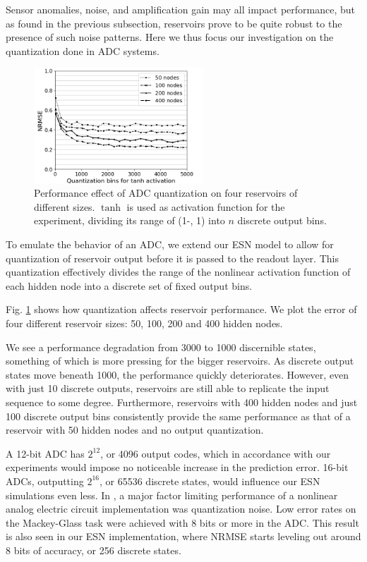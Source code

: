 Sensor anomalies, noise, and amplification gain may all impact performance, but
as found in the previous subsection, reservoirs prove to be quite robust to the
presence of such noise patterns. Here we thus focus our investigation on the
quantization done in ADC systems.


\begin{figure}[H]
  \centering
  \includegraphics[width=2.5in]{img/adc_quantization.png}
  \caption{
    Performance effect of ADC quantization on four reservoirs of different
sizes. $\tanh$ is used as activation function for the experiment, dividing its
range of (1-, 1) into $n$ discrete output bins.
  }
  \label{adc_quantization}
\end{figure}

To emulate the behavior of an ADC, we extend our ESN model to allow for
quantization of reservoir output before it is passed to the readout layer. This
quantization effectively divides the range of the nonlinear activation function
of each hidden node into a discrete set of fixed output bins.

Fig. \ref{adc_quantization} shows how quantization affects reservoir
performance. We plot the error of four different reservoir sizes: 50, 100, 200
and 400 hidden nodes.

We see a performance degradation from 3000 to 1000 discernible states, something
of which is more pressing for the bigger reservoirs. As discrete output states
move beneath 1000, the performance quickly deteriorates. However, even with just
10 discrete outputs, reservoirs are still able to replicate the input sequence
to some degree. Furthermore, reservoirs with 400 hidden nodes and just 100
discrete output bins consistently provide the same performance as that of a
reservoir with 50 hidden nodes and no output quantization.

A 12-bit ADC has $2^{12}$, or 4096 output codes, which in accordance with our
experiments would impose no noticeable increase in the prediction error. 16-bit
ADCs, outputting $2^{16}$, or 65536 discrete states, would influence our ESN
simulations even less. In \cite{soriano_delay-based_2015}, a major factor
limiting performance of a nonlinear analog electric circuit implementation was
quantization noise. Low error rates on the Mackey-Glass task were achieved with
8 bits or more in the ADC. This result is also seen in our ESN implementation,
where NRMSE starts leveling out around 8 bits of accuracy, or 256 discrete
states.

